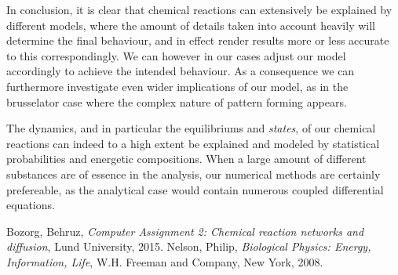 \documentclass[a4paper,12pt]{article}
\theoremstyle{plain}
\theoremstyle{definition}
\begin{document}
      In conclusion, it is clear that chemical reactions can extensively be
      explained by different models, where the amount of details taken
      into account heavily will determine the final behaviour, and in effect
      render results more or less accurate to this correspondingly. We can
      however in our cases adjust our model accordingly to achieve the intended
      behaviour. As a consequence we can furthermore investigate even wider
      implications of our model, as in the brusselator case where
      the complex nature of pattern forming appears.

      The dynamics, and in particular the equilibriums and \textit{states}, 
      of our chemical reactions can indeed to a
      high extent be explained and modeled by statistical probabilities and
      energetic compositions. When a large amount of different substances are of
      essence in the analysis, our numerical methods are certainly prefereable,
      as the analytical case would contain numerous coupled differential
      equations.

\begin{thebibliography}{99}
     Bozorg, Behruz,
     \emph{Computer Assignment 2: Chemical reaction networks and diffusion},
     Lund University,
     2015.
     Nelson, Philip,
     \emph{Biological Physics: Energy, Information, Life},
     W.H. Freeman and Company,
     New York,
     2008.
\end{thebibliography}
\end{document}

